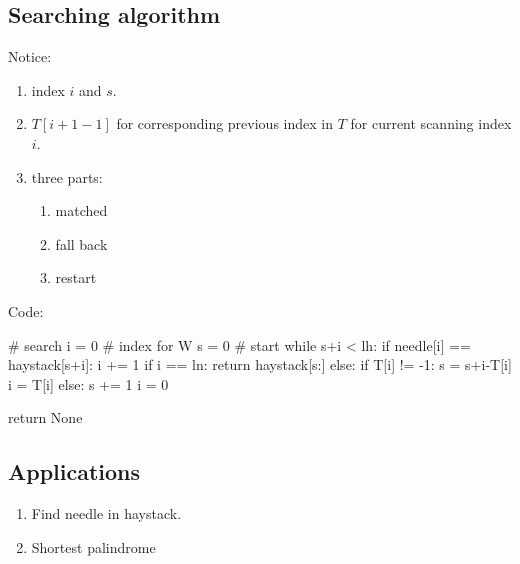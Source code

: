 \subsection{Searching algorithm}
Notice:
\begin{enumerate}
\item index $i$ and $s$.
\item $T[i+1-1]$ for corresponding previous index in $T$ for current scanning index $i$. 
\item three parts:
\begin{enumerate}
\item matched
\item fall back
\item restart 
\end{enumerate}
\end{enumerate}
Code: 
\begin{python}
# search
i = 0  # index for W 
s = 0  # start 
while s+i < lh:
    if needle[i] == haystack[s+i]:
        i += 1
        if i == ln:
            return haystack[s:]
    else:
        if T[i] != -1:
            s = s+i-T[i]
            i = T[i]
        else:
            s += 1
            i = 0

return None
\end{python}
\subsection{Applications}
\begin{enumerate}
\item Find needle in haystack. 
\item Shortest palindrome 
\end{enumerate}

